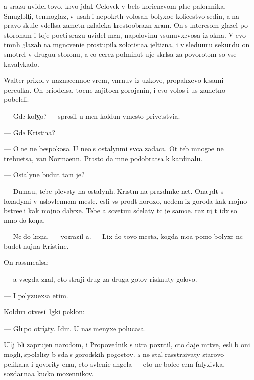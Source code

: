\documentclass[10pt]{book}
\begin{document}
{\Y}a srazu uvidel tovo, kovo jdal. Celovek v belo-koricnevom pla{\x}e palomnika. Smugloli{\c}i{\y}, temnoglaz{\yi}{\y}, v usah i nepokr{\yi}t{\yi}h volosah bolyxo{\y}e kolicestvo sedin{\yi}, a na pravo{\y} skule v{\yi}del{\ia}lsa zametn{\yi}{\y} izdaleka krestoobrazn{\yi}{\y} xram. On s interesom glazel po storonam i toje pocti srazu uvidel men{\ia}, napolovinu v{\yi}sunuvxevosa iz okna. V {\y}evo t{\e}mn{\yi}h glazah na mgnoveni{\y}e prostupila zolotista{\y}a jeltizna, i v sledu{\y}u{\x}u{\y}u sekundu on smotrel v drugu{\y}u storonu, a {\y}e{\x}o cerez polminut{\yi} uje skr{\yi}lsa za povorotom so vse{\y} kavalykado{\y}.



Walter prixol v naznacenno{\y}e vrem{\ia}, v{\yi}n{\yi}rnuv iz uzkovo, propahxevo kr{\yi}sami pereulka. On priodelsa, tocno zajitocn{\yi}{\y} gorojanin, i {\y}evo volos{\yi} i us{\yi} zametno pobeleli.

— Gde koly{\c}o? — sprosil u men{\ia} koldun vmesto privetstvi{\y}a.

— Gde Kristina?

— O ne{\y} ne bespoko{\y}sa. U ne{\y}o s ostalyn{\yi}mi svo{\y}a zadaca. Ot teb{\ia} mnogo{\y}e ne trebu{\y}etsa, van Normaenn. Prosto da{\y} mne podobratsa k kardinalu.

— Ostalyn{\yi}{\y}e budut tam je?

— Duma{\y}u, tebe plevaty na ostalyn{\yi}h. Kristin{\yi} na prazdnike net. Ona jd{\e}t s lo\-xady\-mi v uslovlennom meste. {\Y}esli vs{\e} pro{\y}d{\e}t horoxo, u{\y}edem iz go\-ro\-da kak mojno b{\yi}stre{\y}e i kak mojno dalyxe. Tebe {\y}a sovetu{\y}u sdelaty to je samo{\y}e, raz uj t{\yi} id{\e}x so mno{\y} do kon{\c}a.

— Ne do kon{\c}a, — vozrazil {\y}a. — Lix do tovo mesta, kogda mo{\y}a pomo{\x} bolyxe ne budet nujna Kristine.

On rassme{\y}alsa:

— {\Y}a vsegda znal, cto straji drug za druga gotov{\yi} risknuty go\-lo\-vo{\y}.

— I polyzu{\y}exsa etim.

Koldun otvesil l{\e}gki{\y} poklon:

— Glupo otri{\c}aty. Id{\e}m. U nas menyxe polucasa.

Uli{\c}i b{\yi}li zaprujen{\yi} narodom, i Pro\-po\-ved\-nik s utra poxutil, cto daje m{\e}rtv{\yi}{\y}e, {\y}esli b{\yi} oni mogli, spolzlisy b{\yi} s{\io}da s gorodskih pogostov. {\Y}a ne stal rasstra{\y}ivaty starovo pelikana i govority {\y}emu, cto {\y}avleni{\y}e angela — eto ne bole{\y}e cem falyxivka, sozdanna{\y}a kucko{\y} moxennikov.
\end{document}
